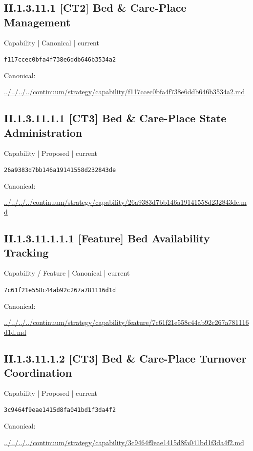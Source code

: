 \documentclass[10pt,a4paper]{article}
\begin{document}
\subsection*{II.1.3.11.1 [CT2] Bed \& Care-Place Management}
{\small Capability | Canonical | current}\par
\texttt{f117ccec0bfa4f738e6ddb646b3534a2}\par
Canonical: \par
{\footnotesize\url{../../../../continuum/strategy/capability/f117ccec0bfa4f738e6ddb646b3534a2.md}}\par
\subsection*{II.1.3.11.1.1 [CT3] Bed \& Care-Place State Administration}
{\small Capability | Proposed | current}\par
\texttt{26a9383d7bb146a19141558d232843de}\par
Canonical: \par
{\footnotesize\url{../../../../continuum/strategy/capability/26a9383d7bb146a19141558d232843de.md}}\par
\subsection*{II.1.3.11.1.1.1 [Feature] Bed Availability Tracking}
{\small Capability / Feature | Canonical | current}\par
\texttt{7c61f21e558c44ab92c267a781116d1d}\par
Canonical: \par
{\footnotesize\url{../../../../continuum/strategy/capability/feature/7c61f21e558c44ab92c267a781116d1d.md}}\par
\subsection*{II.1.3.11.1.2 [CT3] Bed \& Care-Place Turnover Coordination}
{\small Capability | Proposed | current}\par
\texttt{3c9464f9eae1415d8fa041bd1f3da4f2}\par
Canonical: \par
{\footnotesize\url{../../../../continuum/strategy/capability/3c9464f9eae1415d8fa041bd1f3da4f2.md}}\par
\end{document}
